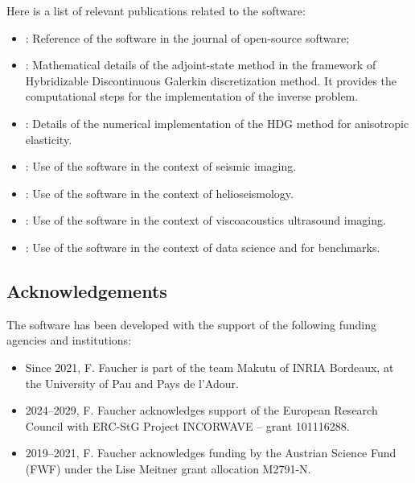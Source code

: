 Here is a list of relevant publications related to the software:
\begin{itemize}
\item \cite{Hawen2021}: Reference of the software in the journal of open-source software;
\item \cite{Faucher2020adjoint}:
      Mathematical details of the adjoint-state method in the framework 
      of Hybridizable Discontinuous Galerkin discretization method.
      It provides the computational steps for the implementation of the 
      inverse problem.
\item \cite{Pham2024stabilization}: Details of the numerical implementation 
      of the HDG method for anisotropic elasticity.
\item \cite{Faucher2019FRgWIGeo,Faucher2020DAS}: 
      Use of the software in the context of seismic imaging.
\item \cite{Pham2020Siam,Pham2024assembling}:
      Use of the software in the context of helioseismology.
\item \cite{Faucher2023viscoacoustic}: 
      Use of the software in the context of viscoacoustics ultrasound imaging.
\item \cite{Liu2024,Benitez2024}: 
      Use of the software in the context of data science and
      for benchmarks.
\end{itemize}


\subsection{Acknowledgements}
\label{sec::Hawen:acknowledgements}

The software has been developed with the support of the following funding agencies and institutions: 

\begin{itemize}
  \item Since 2021, F. Faucher is part of the team Makutu of INRIA Bordeaux, at the 
                    University of Pau and Pays de l'Adour.
  \item 2024--2029, F. Faucher acknowledges support of the European Research Council 
                    with ERC-StG Project INCORWAVE -- grant 101116288.
  \item 2019--2021, F. Faucher acknowledges funding by the Austrian Science Fund (FWF) 
        under the Lise Meitner grant allocation M2791-N.
\end{itemize}


